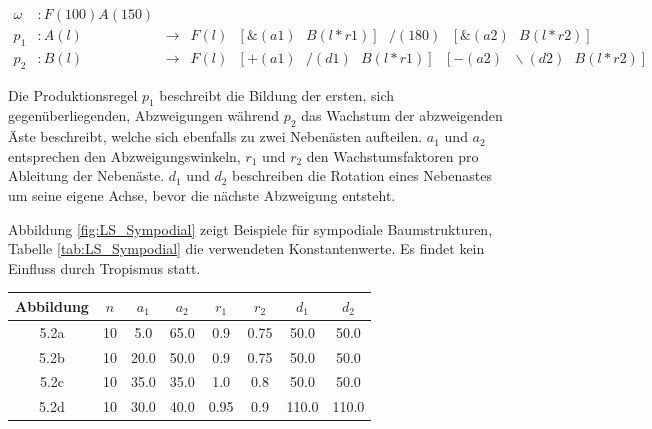\begin{equation}
\begin{array}{llll}
\omega & : F(100)A(150) \\
p_1 & : A(l) &\rightarrow& F(l)\text{ }[\&(a1)\text{ }B(l*r1)]\text{ }/(180)\text{ }[\&(a2)\text{ }B(l*r2)] \\
p_2 &  : B(l) &\rightarrow& F(l)\text{ }[+(a1)\text{ }/(d1)\text{ }B(l*r1)]\text{ }[-(a2)\text{ }\backslash(d2)\text{ }B(l*r2)]
\end{array}
\label{eq:ProdSympodial}
\end{equation} 

\cite[S.59]{ABOP:04}

Die Produktionsregel $p_1$ beschreibt die Bildung der ersten, sich gegenüberliegenden, Abzweigungen während $p_2$ das Wachstum der abzweigenden Äste beschreibt, welche sich ebenfalls zu zwei Nebenästen aufteilen. $a_1$ und $a_2$ entsprechen den Abzweigungswinkeln, $r_1$ und $r_2$ den Wachstumsfaktoren pro Ableitung der Nebenäste. $d_1$ und $d_2$ beschreiben die Rotation eines Nebenastes um seine eigene Achse, bevor die nächste Abzweigung entsteht.

Abbildung \ref{fig:LS_Sympodial} zeigt Beispiele für sympodiale Baumstrukturen, Tabelle \ref{tab:LS_Sympodial} die verwendeten Konstantenwerte. Es findet kein Einfluss durch Tropismus statt.

\begin{center}
	\begin{tabulary}{\textwidth}{|C|C|C|C|C|C|C|C|}
		\hline 
		Abbildung & $n$ & $a_1$ & $a_2$ & $r_1$ & $r_2$ & $d_1$ & $d_2$ \\ 
		\hline 
		5.2a & 10 & 5.0 & 65.0 & 0.9 & 0.75 & 50.0 & 50.0 \\ 
		\hline 
		5.2b & 10 & 20.0 & 50.0 & 0.9 & 0.75 & 50.0 & 50.0 \\ 
		\hline 
		5.2c & 10 & 35.0 & 35.0 & 1.0 & 0.8 & 50.0 & 50.0 \\ 
		\hline 
		5.2d & 10 & 30.0 & 40.0 & 0.95 & 0.9 & 110.0 & 110.0 \\ 
		\hline 
	\end{tabulary} 
	\label{tab:LS_Sympodial}
\end{center}

